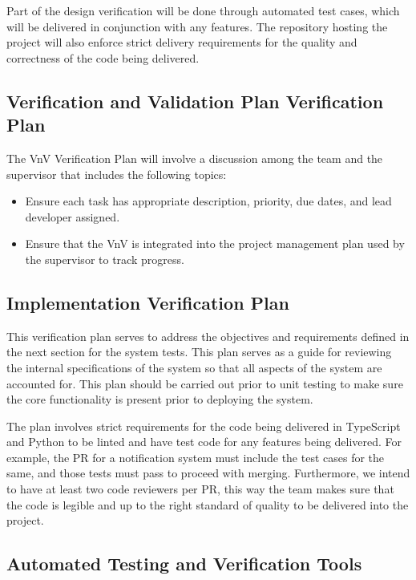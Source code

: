 \documentclass[12pt, titlepage]{article}
\begin{document}
Part of the design verification will be done through automated test cases, which will be delivered in conjunction with any features. The repository hosting the project will also enforce strict delivery requirements for the quality and correctness of the code being delivered. 

\subsection{Verification and Validation Plan Verification Plan}

The VnV Verification Plan will involve a discussion among the team and the supervisor that includes the following topics:

\begin{itemize}
    \item Ensure each task has appropriate description, priority, due dates, and lead developer assigned.
    \item Ensure that the VnV is integrated into the project management plan used by the supervisor to track progress.
\end{itemize}

\subsection{Implementation Verification Plan}

This verification plan serves to address the objectives and requirements defined in the next section for the system tests. This plan serves as a guide for reviewing the internal specifications of the system so that all aspects of the system are accounted for. This plan should be carried out prior to unit testing to make sure the core functionality is present prior to deploying the system.
 
\noindent The plan involves strict requirements for the code being delivered in TypeScript and Python to be linted and have test code for any features being delivered. For example, the PR for a notification system must include the test cases for the same, and those tests must pass to proceed with merging. Furthermore, we intend to have at least two code reviewers per PR, this way the team makes sure that the code is legible and up to the right standard of quality to be delivered into the project.

\subsection{Automated Testing and Verification Tools}
\end{document}

